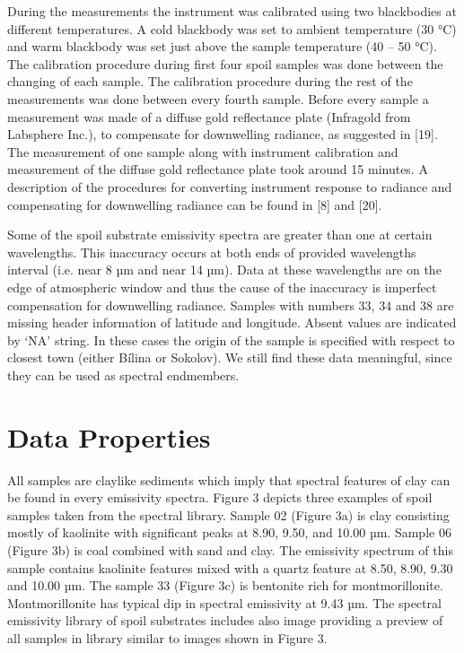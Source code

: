 During the measurements the instrument was calibrated using two blackbodies at different temperatures. A cold blackbody was set to ambient temperature (30 °C) and warm blackbody was set just above the sample temperature (40 – 50 °C). The calibration procedure during first four spoil samples was done between the changing of each sample. The calibration procedure during the rest of the measurements was done between every fourth sample. Before every sample a measurement was made of a diffuse gold reflectance plate (Infragold from Labsphere Inc.), to compensate for downwelling radiance, as suggested in [19]. The measurement of one sample along with instrument calibration and measurement of the diffuse gold reflectance plate took around 15 minutes. A description of the procedures for converting instrument response to radiance and compensating for downwelling radiance can be found in [8] and [20].

Some of the spoil substrate emissivity spectra are greater than one at certain wavelengths. This inaccuracy occurs at both ends of provided wavelengths interval (i.e. near 8 µm and near 14 µm). Data at these wavelengths are on the edge of atmospheric window and thus the cause of the inaccuracy is imperfect compensation for downwelling radiance. Samples with numbers 33, 34 and 38 are missing header information of latitude and longitude. Absent values are indicated by ‘NA’ string. In these cases the origin of the sample is specified with respect to closest town (either Bílina or Sokolov). We still find these data meaningful, since they can be used as spectral endmembers.


\section{Data Properties}

All samples are claylike sediments which imply that spectral features of clay can be found in every emissivity spectra. Figure 3 depicts three examples of spoil samples taken from the spectral library. Sample 02 (Figure 3a) is clay consisting mostly of kaolinite with significant peaks at 8.90, 9.50, and 10.00 µm. Sample 06 (Figure 3b) is coal combined with sand and clay. The emissivity spectrum of this sample contains kaolinite features mixed with a quartz feature at 8.50, 8.90, 9.30 and 10.00 µm. The sample 33 (Figure 3c) is bentonite rich for montmorillonite. Montmorillonite has typical dip in spectral emissivity at 9.43 µm. The spectral emissivity library of spoil substrates includes also image providing a preview of all samples in library similar to images shown in Figure 3.

